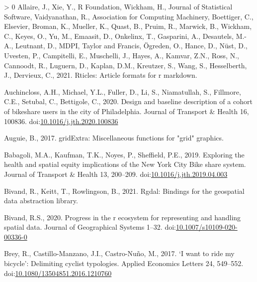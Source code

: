 \documentclass[]{elsarticle} %
\newlength{\cslhangindent}
\newenvironment{CSLReferences}[3] %
 {%
  \setlength{\parindent}{0pt}
  \ifodd #1 \everypar{\setlength{\hangindent}{\cslhangindent}}\ignorespaces\fi
  \ifnum #2 > 0
  \setlength{\parskip}{#2\baselineskip}
  \fi
 }%
 {}
\begin{document}
\hypertarget{refs}{}
\begin{CSLReferences}{1}{0}
\leavevmode\hypertarget{ref-R-rticles}{}%
Allaire, J., Xie, Y., R Foundation, Wickham, H., Journal of Statistical
Software, Vaidyanathan, R., Association for Computing Machinery,
Boettiger, C., Elsevier, Broman, K., Mueller, K., Quast, B., Pruim, R.,
Marwick, B., Wickham, C., Keyes, O., Yu, M., Emaasit, D., Onkelinx, T.,
Gasparini, A., Desautels, M.-A., Leutnant, D., MDPI, Taylor and Francis,
Ögreden, O., Hance, D., Nüst, D., Uvesten, P., Campitelli, E.,
Muschelli, J., Hayes, A., Kamvar, Z.N., Ross, N., Cannoodt, R., Luguern,
D., Kaplan, D.M., Kreutzer, S., Wang, S., Hesselberth, J., Dervieux, C.,
2021. Rticles: Article formats for r markdown.

\leavevmode\hypertarget{ref-auchinclossDesignBaselineDescription2020}{}%
Auchincloss, A.H., Michael, Y.L., Fuller, D., Li, S., Niamatullah, S.,
Fillmore, C.E., Setubal, C., Bettigole, C., 2020. Design and baseline
description of a cohort of bikeshare users in the city of
{Philadelphia}. Journal of Transport \& Health 16, 100836.
doi:\href{https://doi.org/10.1016/j.jth.2020.100836}{10.1016/j.jth.2020.100836}

\leavevmode\hypertarget{ref-R-gridExtra}{}%
Auguie, B., 2017. gridExtra: Miscellaneous functions for "grid"
graphics.

\leavevmode\hypertarget{ref-babagoliExploringHealthSpatial2019}{}%
Babagoli, M.A., Kaufman, T.K., Noyes, P., Sheffield, P.E., 2019.
Exploring the health and spatial equity implications of the {New York
City Bike} share system. Journal of Transport \& Health 13, 200--209.
doi:\href{https://doi.org/10.1016/j.jth.2019.04.003}{10.1016/j.jth.2019.04.003}

\leavevmode\hypertarget{ref-R-rgdal}{}%
Bivand, R., Keitt, T., Rowlingson, B., 2021. Rgdal: Bindings for the
geospatial data abstraction library.

\leavevmode\hypertarget{ref-bivand2020progress}{}%
Bivand, R.S., 2020. Progress in the r ecosystem for representing and
handling spatial data. Journal of Geographical Systems 1--32.
doi:\href{https://doi.org/10.1007/s10109-020-00336-0}{10.1007/s10109-020-00336-0}

\leavevmode\hypertarget{ref-breyWantRideMy2017}{}%
Brey, R., Castillo-Manzano, J.I., Castro-Nuño, M., 2017. {`{I} want to
ride my bicycle'}: Delimiting cyclist typologies. Applied Economics
Letters 24, 549--552.
doi:\href{https://doi.org/10.1080/13504851.2016.1210760}{10.1080/13504851.2016.1210760}


\end{CSLReferences}
\end{document}
